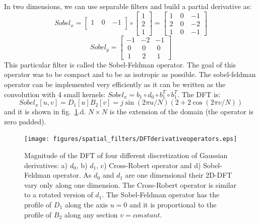 In two dimensions, we can use separable filters and build a partial derivative as:
\begin{equation}
Sobel_x =  \begin{bmatrix}
  1 ~& 0 ~& -1 \\
\end{bmatrix}\circ \begin{bmatrix}
  1 \\
  2 \\
  1
\end{bmatrix}=
\begin{bmatrix}
  1 ~& 0 ~& -1 \\
  2 ~& 0 ~& -2\\
  1~&  0 ~& -1
\end{bmatrix}
\end{equation}
\begin{equation}
Sobel_y =  \begin{bmatrix}
  -1 & -2 & -1 \\
 ~0 & ~0 & ~0\\
  ~1&  ~2 & ~1
\end{bmatrix}
\end{equation}
This particular filter is called the Sobel-Feldman operator. The goal of this operator was to be compact and to be as isotropic as possible. The sobel-feldman operator can be implemented very efficiently as it can be written as the convolution with 4 small kernels: $Sobel_x=b_1 \circ d_0 \circ b_1^T \circ b_1^T$.  The DFT is: 
\begin{equation}
Sobel_x \left[u,v \right] = D_1\left[u\right] B_2 \left[v \right] = j \sin \left( 2 \pi u /N \right) \left( 2+2 \cos \left(2 \pi v/N \right) \right)
\end{equation}
and it is shown in fig.~\ref{fig:DFTderivativeoperators}.d. $N \times N$ is the extension of the domain (the operator is zero padded). 

\begin{figure}
\centerline{
\texttt{[image: figures/spatial\_filters/DFTderivativeoperators.eps]}}
\caption{Magnitude of the DFT of four different discretization of Gaussian derivatives: a) $d_0$, b) $d_1$, c) Cross-Robert operator and d) Sobel-Feldman operator.  As $d_0$ and $d_1$ are one dimensional their 2D-DFT vary only along one dimension. The Cross-Robert operator is similar to a rotated version of $d_1$. The Sobel-Feldman operator has the profile of $D_1$ along the axis $u=0$ and it is proportional to the profile of $B_2$ along any section $v=constant$.
} 
\label{fig:DFTderivativeoperators}
\end{figure}


